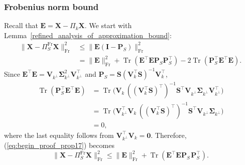 \documentclass[twoside,11pt]{book}
\numberwithin{theorem}{chapter}
\numberwithin{definition}{chapter}
\numberwithin{proposition}{chapter}
\numberwithin{corollary}{chapter}
\numberwithin{example}{chapter}
\numberwithin{lemma}{chapter}
\numberwithin{assumption}{chapter}
\DeclareMathOperator{\Tr}{Tr}
\DeclareMathOperator{\Fr}{\mathrm{Fr}}
\DeclareMathOperator{\Tran}{\intercal}
\begin{document}
\subsubsection{Frobenius norm bound}
\label{s:frobNormThm19}
Recall that $\bm{E} = \bm{X} - \Pi_{k}\bm{X}$.
We start with Lemma~\ref{refined_analysis_of_approximation_bound}:
\begin{equation}
\label{eq:begin_proof_prop17}
	\begin{split}
		\| \bm{X} - \Pi_{S}^{\Fr}\bm{X} \|_{\Fr}^{2}  & \leq  \| \bm{E}(\bm{I}-\bm{P}_{S})\|_{\Fr}^{2}\\
		& = \| \bm{E}\|_{\Fr}^{2} + \Tr(\bm{E}^{\Tran}\bm{E}\bm{P}_{S}\bm{P}_{S}^{\Tran}) - 2\Tr(\bm{P}_{S}^{\Tran}		\bm{E}^{\Tran}\bm{E}).
	\end{split}
\end{equation}
Since $\bm{E}^{\Tran}\bm{E} = \bm{V}_{k^{\perp}}^{\phantom{\Tran}}\bm{\Sigma}_{k^{\perp}}^{2}\bm{V}_{k^{\perp}}^{\Tran}$ and $\bm{P}_{S} = \bm{S}(\bm{V}_{k}^{\Tran}\bm{S})^{-1}\bm{V}_{k}^{\Tran}$,
\begin{equation}
        \begin{split}
        		\Tr(\bm{P}_{S}^{\Tran}\bm{E}^{\Tran}\bm{E})  & =  \Tr \bigg(\bm{V}_{k}^{\phantom{\Tran}}((\bm{V}_{k}^{\Tran}		\bm{S})^{\Tran})^{-1}\bm{S}^{\Tran}\bm{V}_{k^{\perp}}^{\phantom{\Tran}}\bm{\Sigma}_{k^{\perp}}^{\phantom{\Tran}}\bm{V}		_{k^{\perp}}^{\Tran} \bigg)  \\
        		& = \Tr \bigg( \bm{V}_{k^{\perp}}^{\Tran}\bm{V}_{k}^{\phantom{\Tran}}((\bm{V}_{k}^{\Tran}\bm{S})^{\Tran})^{-1}\bm{S}		^{\Tran}\bm{V}_{k^{\perp}}^{\phantom{\Tran}}\bm{\Sigma}_{k^{\perp}}^{\phantom{\Tran}} \bigg)  \\
      		  & = 0,
        \end{split}
\end{equation}
where the last equality follows from $\bm{V}_{k^{\perp}}^{\Tran}\bm{V}_{k} = \bm{0}$.
Therefore, (\ref{eq:begin_proof_prop17}) becomes
\begin{equation}
	\| \bm{X} - \Pi_{S}^{\Fr}\bm{X} \|_{\Fr}^{2}  \leq \| \bm{E}\|_{\Fr}^{2} + \Tr(\bm{E}^{\Tran}\bm{E}\bm{P}^{\phantom{\Tran}}	_{S}\bm{P}^{\Tran}_{S}).
\end{equation}
\end{document}
